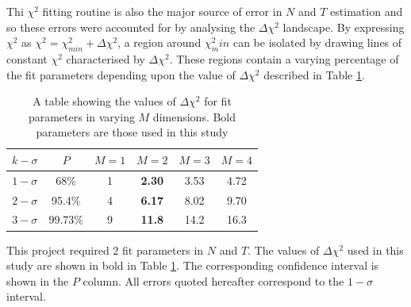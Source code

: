\documentclass{report}
\begin{document}
Thi $\chi^{2}$ fitting routine is also the major source of error in $N$ and $T$ estimation and so these errors were accounted for by analysing the $\Delta \chi^{2}$ landscape. By expressing $\chi^{2}$ as $\chi^{2} = \chi^{2}_{min} + \Delta \chi^{2}$, a region around $\chi^{2}_min$ can be isolated by drawing lines of constant $\chi^{2}$ characterised by $\Delta \chi^{2}$. These regions contain a varying percentage of the fit parameters depending upon the value of $\Delta \chi^{2}$ described in Table \ref{table:delta}.

\begin{table}[]
\centering
\begin{tabular}{|c|c|cccc}
  \hline
  \textit{\textbf{$k -\sigma$}} & \textit{\textbf{$P$}} & \multicolumn{1}{c|}{\textit{\textbf{$M = 1$}}} & \multicolumn{1}{c|}{\textit{\textbf{$M = 2$}}} & \multicolumn{1}{c|}{\textit{\textbf{$M = 3$}}} & \multicolumn{1}{c|}{\textit{\textbf{$M = 4$}}} \\ \hline
  $1 -\sigma$                   & 68\%                  & 1                                              & \textbf{2.30}                                           & 3.53                                           & 4.72                                           \\ \cline{1-2}
  $2 -\sigma$                   & 95.4\%                & 4                                              & \textbf{6.17}                                           & 8.02                                           & 9.70                                           \\ \cline{1-2}
  $3 -\sigma$                   & 99.73\%               & 9                                              & \textbf{11.8}                                           & 14.2                                           & 16.3                                           \\ \cline{1-2}
  \end{tabular}
  \caption{A table showing the values of $\Delta \chi^{2}$ for fit parameters in varying $M$ dimensions. Bold parameters are those used in this study \parencite{recipes}}
  \label{table:delta}
\end{table}

This project required 2 fit parameters in $N$ and $T$. The values of $\Delta \chi^{2}$ used in this study are shown in bold in Table \ref{table:delta}. The corresponding confidence interval is shown in the $P$ column. All errors quoted hereafter correspond to the $1 - \sigma$ interval.
\end{document}
